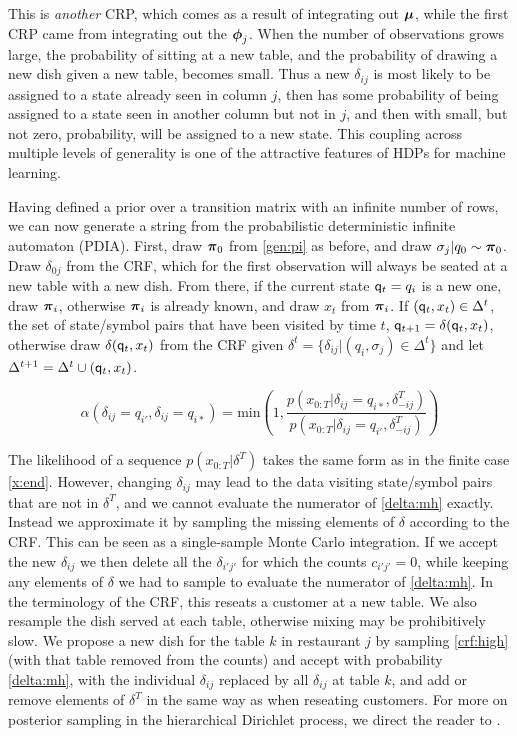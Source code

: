 {This is {\em another} CRP, which comes as a result of integrating out $\bmu$, while the first CRP came from integrating out the $\bphi_j$.  When the number of observations grows large, the probability of sitting at a new table, and the probability of drawing a new dish given a new table, becomes small.  Thus a new $\delta_{ij}$ is most likely to be assigned to a state already seen in column $j$, then has some probability of being assigned to a state seen in another column but not in $j$, and then with small, but not zero, probability, will be assigned to a new state.  This coupling across multiple levels of generality is one of the attractive features of HDPs for machine learning.
}

Having defined a prior over a transition matrix with an infinite number of rows, we can now generate a string from the probabilistic deterministic infinite automaton (PDIA).  First, draw $\bpi_0$ from \eqref{gen:pi} as before, and draw $\sigma_j|q_0 \sim \bpi_0$.  Draw $\delta_{0j}$ from the CRF, which for the first observation will always be seated at a new table with a new dish.  From there, if the current state $\q_t = q_i$ is a new one, draw $\bpi_i$, otherwise $\bpi_i$ is already known, and draw $x_t$ from $\bpi_i$.  If $(\q_t,x_t) \in \Delta^t$, the set of state/symbol pairs that have been visited by time $t$, $\q_{t+1} = \delta(\q_t,x_t)$, otherwise draw $\delta(\q_t,x_t)$ from the CRF given $\delta^t = \{\delta_{ij}|(q_i,\sigma_j)\in\Delta^t\}$ and let $\Delta^{t+1} = \Delta^t \cup (\q_t,x_t)$.

\begin{equation}
 \alpha(\delta_{ij}=q_{i'},\delta_{ij}=q_{i*}) =  \mathrm{min}\left(1,\frac{p(x_{0:T}|\delta_{ij}=q_{i*},\delta_{-ij}^T)}{p(x_{0:T}|\delta_{ij}=q_{i'},\delta_{-ij}^T)}\right) \label{delta:mh}
\end{equation}

The likelihood of a sequence $p(x_{0:T}|\delta^T)$ takes the same form as in the finite case \eqref{x:end}.  However, changing $\delta_{ij}$ may lead to the data visiting state/symbol pairs that are not in $\delta^T$, and we cannot evaluate the numerator of \eqref{delta:mh} exactly.  Instead we approximate it by sampling the missing elements of $\delta$ according to the CRF.  This can be seen as a single-sample Monte Carlo integration.  If we accept the new $\delta_{ij}$ we then delete all the $\delta_{i'j'}$ for which the counts $c_{i'j'} = 0$, while keeping any elements of $\delta$ we had to sample to evaluate the numerator of \eqref{delta:mh}.  In the terminology of the CRF, this reseats a customer at a new table.  We also resample the dish served at each table, otherwise mixing may be prohibitively slow.  We propose a new dish for the table $k$ in restaurant $j$ by sampling \eqref{crf:high} (with that table removed from the counts) and accept with probability \eqref{delta:mh}, with the individual $\delta_{ij}$ replaced by all $\delta_{ij}$ at table $k$, and add or remove elements of $\delta^T$ in the same way as when reseating customers.  For more on posterior sampling in the hierarchical Dirichlet process, we direct the reader to \cite{Teh2006}.
  
